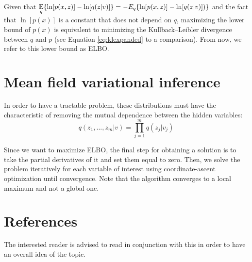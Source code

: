 Given that $ \displaystyle \operatorname*{\mathbb{E}}_q \{\ln[p(x,z)] - \ln[q(z | v)]\} = - E_q \{ \ln[p(x,z)] -\ln[q(z | v)]) \}$
and the fact that $\ln[p(x)]$ is a constant that does not depend on $q$,
maximizing the lower bound of $p(x)$ is equivalent to minimizing the Kullback–Leibler divergence between $q$ and $p$ (see Equation \ref{eq:klexpanded} to a comparison).
From now, we refer to this lower bound as ELBO.

\section{Mean field variational inference}
In order to have a tractable problem, these distributions must have the characteristic
of removing the mutual dependence between the hidden variables:
$$ q(z_1, ..., z_m| v) = \prod_{j=1}^m q(z_j | v_j) $$

Since we want to maximize ELBO,
the final step for obtaining a solution is to take the partial derivatives of it and set them equal to zero.
Then, we solve the problem iteratively for each variable of interest using coordinate-ascent optimization until convergence.
Note that the algorithm converges to a local maximum and not a global one.

\section{References}
The interested reader is advised to read \cite{Blei_2017} in conjunction with this in order to have an overall idea of the topic.